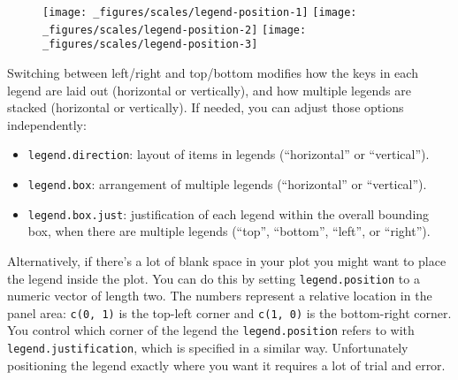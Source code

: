 \begin{figure}[H]
  \texttt{[image: \_figures/scales/legend-position-1]}%
  \texttt{[image: \_figures/scales/legend-position-2]}%
  \texttt{[image: \_figures/scales/legend-position-3]}
\end{figure}

Switching between left/right and top/bottom modifies how the keys in
each legend are laid out (horizontal or vertically), and how multiple
legends are stacked (horizontal or vertically). If needed, you can
adjust those options independently:

\begin{itemize}
\item
  \texttt{legend.direction}: layout of items in legends (``horizontal''
  or ``vertical'').
\item
  \texttt{legend.box}: arrangement of multiple legends (``horizontal''
  or ``vertical'').
\item
  \texttt{legend.box.just}: justification of each legend within the
  overall bounding box, when there are multiple legends (``top'',
  ``bottom'', ``left'', or ``right'').
\end{itemize}

Alternatively, if there's a lot of blank space in your plot you might
want to place the legend inside the plot. You can do this by setting
\texttt{legend.position} to a numeric vector of length two. The numbers
represent a relative location in the panel area: \texttt{c(0,\ 1)} is
the top-left corner and \texttt{c(1,\ 0)} is the bottom-right corner.
You control which corner of the legend the \texttt{legend.position}
refers to with \texttt{legend.justification}, which is specified in a
similar way. Unfortunately positioning the legend exactly where you want
it requires a lot of trial and error.

